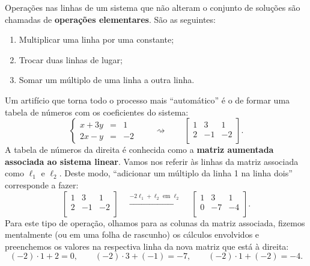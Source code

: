 \documentclass[../livro.tex]{subfiles} %
\begin{document}
\vspace{0.2cm}

Operações nas linhas de um sistema que não alteram o conjunto de soluções são chamadas de \textbf{operações elementares}. São as seguintes:
\begin{enumerate}
  \item Multiplicar uma linha por uma constante;
  \item Trocar duas linhas de lugar;
  \item Somar um múltiplo de uma linha a outra linha.
\end{enumerate}

\vspace{0.2cm}

Um artifício que torna todo o processo mais ``automático'' é o de formar uma tabela de números com os coeficientes do sistema:
\begin{equation}
  \left\{
    \begin{array}{rcl}
      x+3y&=&1 \\
      2x-y&=&-2
    \end{array}
  \right. \qquad \rightsquigarrow \qquad  \left[
                             \begin{array}{cc|c}
                               1 & 3 & 1 \\
                               2 & -1 & -2 \\
                             \end{array}
                           \right].
\end{equation} A tabela de números da direita é conhecida como a \textbf{matriz aumentada associada ao sistema linear}. Vamos nos referir às linhas da matriz associada como $\ell_1$ e $\ell_2$. Deste modo, ``adicionar um múltiplo da linha 1 na linha dois'' corresponde a fazer:
\begin{equation}
\left[
                             \begin{array}{cc|c}
                               1 & 3 & 1 \\
                               2 & -1 & -2 \\
                             \end{array}
                           \right] \quad \xrightarrow{-2\ell_1 + \ell_2 \text{ em } \ell_2} \quad
\left[
                             \begin{array}{cc|c}
                               1 & 3 & 1 \\
                               0 & -7 & -4 \\
                             \end{array}
                           \right].
\end{equation} Para este tipo de operação, olhamos para as colunas da matriz associada, fizemos mentalmente (ou em uma folha de rascunho) os cálculos envolvidos e preenchemos os valores na respectiva linha da nova matriz que está à direita:
\begin{equation}
(-2)\cdot 1 + 2 = 0, \qquad (-2)\cdot 3 + (-1) = -7, \qquad (-2) \cdot 1 + (-2) = -4.
\end{equation}
\end{document}
